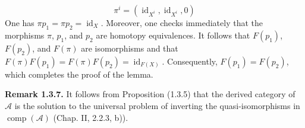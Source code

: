 \begin{equation}
\pi^i=(\operatorname{id}_{X^i},\operatorname{id}_{X^i},0)
\tag{1.3.6.3}
\end{equation}
One has $\pi p_1=\pi p_2=\operatorname{id}_X$. Moreover, one checks
immediately that the morphisms $\pi$, $p_1$, and $p_2$ are homotopy
equivalences. It follows that $F(p_1)$, $F(p_2)$, and $F(\pi)$ are
isomorphisms and that
$F(\pi)F(p_1)=F(\pi)F(p_2)=\operatorname{id}_{F(X)}$. Consequently,
$F(p_1)=F(p_2)$, which completes the proof of the lemma.

\medskip\noindent\textbf{Remark 1.3.7.}\quad
It follows from Proposition (1.3.5) that the derived category of
$\mathcal A$ is the solution to the universal problem of inverting the
quasi-isomorphisms in $\operatorname{comp}(\mathcal A)$ (Chap. II, 2.2.3,
b)).
\endgroup

